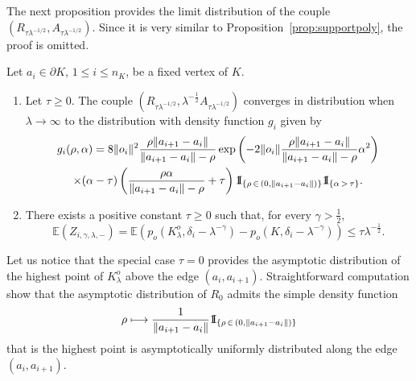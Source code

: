 \documentclass[AHL,Unicode,longabstracts,published]{cedram}
\newcommand{\indicat}{{\text{1}}\negthickspace\text{I}}
\newcommand{\E}{\mathbb{E}}
\newcommand{\pass}{\vspace{0.3cm}\noindent}
\newcommand{\noi}{\noindent}
\newcommand*{\romanenumi}{\renewcommand*{\theenumi}{\roman{enumi}}}
\begin{document}
The next proposition provides the limit distribution of the couple $(R_{\tau\lambda^{-1/2}},A_{\tau\lambda^{-1/2}})$. Since it is very similar to Proposition~\ref{prop:supportpoly}, the proof is omitted.

\begin{prop}\label{prop:supportpoly2}
Let $a_i\in\partial K$, $1\leq i \leq n_K$, be a fixed vertex of $K$.
\begin{enumerate}\romanenumi
\item \label{prop4.3.1} Let $\tau\ge 0$. The couple $(R_{\tau\lambda^{-1/2}}, \lambda^{-\frac1{2}}A_{\tau\lambda^{-1/2}})$ converges in distribution when $\lambda\to\infty$ to the distribution with density function $g_i$ given by
\begin{multline*}
g_i(\rho,\alpha) = 8\|o_i\|^2\frac{\rho\|a_{i+1}-a_i\|}{\|a_{i+1}-a_i\|-\rho}\exp\left(-2\|o_i\|\frac{\rho\|a_{i+1}-a_i\|}{\|a_{i+1}-a_i\|-\rho}\alpha^2\right) \\
\times (\alpha-\tau)\left(\frac{\rho\alpha}{\|a_{i+1}-a_i\|-\rho}+\tau\right)\indicat_{\left\{\rho\,\in\,\left(0,\left\|a_{i+1}-a_i\right\|\right)\right\}}\indicat_{\left\{\alpha\,>\,\tau\right\}}.
\end{multline*}
\item \label{prop4.3.2}There exists a positive constant $\tau\ge 0$ such that, for every $\gamma>\tfrac1{2}$,
\[
\E\left(Z_{i,\gamma,\lambda,-}\right) =\E\left(p_o\left(K_{\lambda}^o,\delta_i-\lambda^{-\gamma}\right)-p_o\left(K,\delta_i-\lambda^{-\gamma}\right)\right) \leq \tau\lambda^{-\frac1{2}}.
\]
\end{enumerate}
\end{prop}

Let us notice that the special case $\tau=0$ provides the asymptotic distribution of the highest point of $K_{\lambda}^o$ above the edge $(a_i,a_{i+1})$. Straightforward computation show that the asymptotic distribution of $R_0$ admits the simple density function
\begin{align*}
\rho\longmapsto \frac1{\|a_{i+1}-a_i\|}\indicat_{\left\{\rho\,\in\,\left(0,\left\|a_{i+1}-a_i\right\|\right)\right\}}
\end{align*}
that is the highest point is asymptotically uniformly distributed along the edge $(a_i,a_{i+1})$.
\vspace{0.2em}
\end{document}
